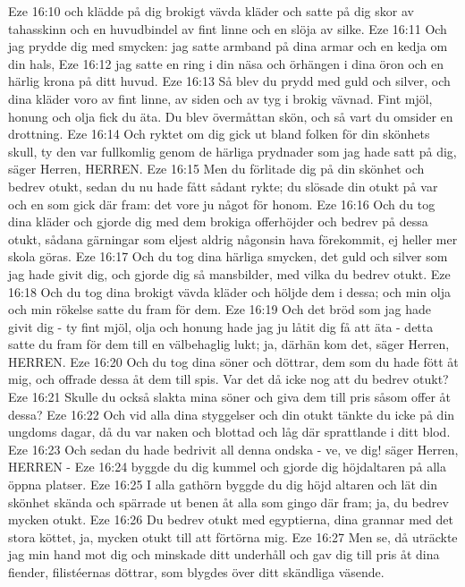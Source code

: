 Eze 16:10  och klädde på dig brokigt vävda kläder och satte på dig skor av tahasskinn och en huvudbindel av fint linne och en slöja av silke.
Eze 16:11  Och jag prydde dig med smycken: jag satte armband på dina armar och en kedja om din hals,
Eze 16:12  jag satte en ring i din näsa och örhängen i dina öron och en härlig krona på ditt huvud.
Eze 16:13  Så blev du prydd med guld och silver, och dina kläder voro av fint linne, av siden och av tyg i brokig vävnad. Fint mjöl, honung och olja fick du äta. Du blev övermåttan skön, och så vart du omsider en drottning.
Eze 16:14  Och ryktet om dig gick ut bland folken för din skönhets skull, ty den var fullkomlig genom de härliga prydnader som jag hade satt på dig, säger Herren, HERREN.
Eze 16:15  Men du förlitade dig på din skönhet och bedrev otukt, sedan du nu hade fått sådant rykte; du slösade din otukt på var och en som gick där fram: det vore ju något för honom.
Eze 16:16  Och du tog dina kläder och gjorde dig med dem brokiga offerhöjder och bedrev på dessa otukt, sådana gärningar som eljest aldrig någonsin hava förekommit, ej heller mer skola göras.
Eze 16:17  Och du tog dina härliga smycken, det guld och silver som jag hade givit dig, och gjorde dig så mansbilder, med vilka du bedrev otukt.
Eze 16:18  Och du tog dina brokigt vävda kläder och höljde dem i dessa; och min olja och min rökelse satte du fram för dem.
Eze 16:19  Och det bröd som jag hade givit dig - ty fint mjöl, olja och honung hade jag ju låtit dig få att äta - detta satte du fram för dem till en välbehaglig lukt; ja, därhän kom det, säger Herren, HERREN.
Eze 16:20  Och du tog dina söner och döttrar, dem som du hade fött åt mig, och offrade dessa åt dem till spis. Var det då icke nog att du bedrev otukt?
Eze 16:21  Skulle du också slakta mina söner och giva dem till pris såsom offer åt dessa?
Eze 16:22  Och vid alla dina styggelser och din otukt tänkte du icke på din ungdoms dagar, då du var naken och blottad och låg där sprattlande i ditt blod.
Eze 16:23  Och sedan du hade bedrivit all denna ondska - ve, ve dig! säger Herren, HERREN -
Eze 16:24  byggde du dig kummel och gjorde dig höjdaltaren på alla öppna platser.
Eze 16:25  I alla gathörn byggde du dig höjd altaren och lät din skönhet skända och spärrade ut benen åt alla som gingo där fram; ja, du bedrev mycken otukt.
Eze 16:26  Du bedrev otukt med egyptierna, dina grannar med det stora köttet, ja, mycken otukt till att förtörna mig.
Eze 16:27  Men se, då uträckte jag min hand mot dig och minskade ditt underhåll och gav dig till pris åt dina fiender, filistéernas döttrar, som blygdes över ditt skändliga väsende.
